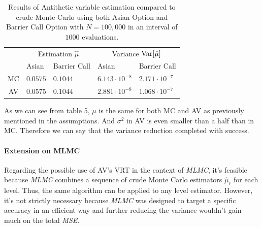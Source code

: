 \begin{table}[H]
\begin{tabular}{ p{1cm}|p{2cm}|p{2cm}|p{2cm}|p{2cm}|  }
\cline{2-5}
& \multicolumn{2}{|c|}{Estimation $\hat{\mu}$}
& \multicolumn{2}{|c|}{Variance $\text{Var}[\hat{\mu}]$} \\
\cline{2-5}
& Asian & Barrier Call & Asian & Barrier Call \\
\hline
\multicolumn{1}{|c|}{MC} & $0.0575$ & $0.1044$ & $6.143 \cdot 10^{-8}$ & $2.171 \cdot 10^{-7}$ \\
\hline
\multicolumn{1}{|c|}{AV} & $0.0575$ & $0.1044$ & $2.881 \cdot 10^{-8}$ & $1.068 \cdot 10^{-7}$ \\
\hline
\end{tabular}
\caption{Results of Antithetic variable estimation compared to crude Monte Carlo using both Asian Option and Barrier Call Option with $N=100,000$ in an interval of $1000$ evaluations.}
\label{tab:AV_MC_two_payoffs}
\end{table}
As we can see from table 5, $\mu$ is the same for both MC and AV as previously mentioned in the assumptions. And $\sigma^2$ in AV is even smaller than a half than in MC. Therefore we can say that the variance reduction completed with success.

\paragraph{Extension on MLMC}
Regarding the possible use of AV's VRT in the context of \textit{MLMC}, it's feasible because \textit{MLMC} combines a sequence of crude Monte Carlo estimators $\hat{\mu}_\ell$ for each level. Thus, the same algorithm can be applied to any level estimator. However, it's not strictly necessary because \textit{MLMC} was designed to target a specific accuracy in an efficient way and further reducing the variance wouldn't gain much on the total \textit{MSE}.
